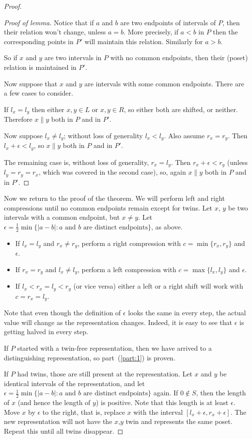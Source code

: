 \begin{proof}
\begin{proof}[Proof of lemma]
Notice that if $a$ and $b$ are two endpoints of intervals of $P$, then their relation won't change, unless $a=b$. More precisely, if $a<b$ in $P$ then the corresponding points in $P'$ will maintain this relation. Similarly for $a>b$.

So if $x$ and $y$ are two intervals in $P$ with no common endpoints, then their (poset) relation is maintained in $P'$.

Now suppose that $x$ and $y$ are intervals with some common endpoints. There are a few cases to consider.

If $l_x=l_y$ then either $x,y\in L$ or $x,y\in R$, so either both are shifted, or neither. Therefore $x\|y$ both in $P$ and in $P'$.

Now suppose $l_x\neq l_y$; without loss of generality $l_x<l_y$. Also assume $r_x=r_y$. Then $l_x+\epsilon<l_y$, so $x\|y$ both in $P$ and in $P'$.

The remaining case is, without loss of generality, $r_x=l_y$. Then $r_x+\epsilon<r_y$ (unless $l_y=r_y=r_x$, which was covered in the second case), so, again $x\|y$ both in $P$ and in $P'$.
\end{proof}

Now we return to the proof of the theorem. We will perform left and right compressions until no common endpoints remain except for twins. Let $x$, $y$ be two intervals with a common endpoint, but $x\neq y$. Let $\epsilon=\frac12\min\{|a-b|:\text{$a$ and $b$ are distinct endpoints}\}$, as above.

\begin{itemize}
\item
If $l_x=l_y$ and $r_x\neq r_y$, perform a right compression with $c=\min\{r_x,r_y\}$ and $\epsilon$.
\item
If $r_x=r_y$ and $l_x\neq l_y$, perform a left compression with $c=\max\{l_x,l_y\}$ and $\epsilon$.
\item If $l_x<r_x=l_y<r_y$ (or vice versa) either a left or a right shift will work with $c=r_x=l_y$.
\end{itemize}

Note that even though the definition of $\epsilon$ looks the same in every step, the actual value will change as the representation changes. Indeed, it is easy to see that $\epsilon$ is getting halved in every step.

If $P$ started with a twin-free representation, then we have arrived to a distinguishing representation, so part~(\ref{part:1}) is proven.

If $P$ had twins, those are still present at the representation. Let $x$ and $y$ be identical intervals of the representation, and let $\epsilon=\frac12\min\{|a-b|:\text{$a$ and $b$ are distinct endpoints}\}$ again. If $0\not\in S$, then the length of $x$ (and hence the length of $y$) is positive. Note that this length is at least $\epsilon$. Move $x$ by $\epsilon$ to the right, that is, replace $x$ with the interval $[l_x+\epsilon,r_x+\epsilon]$. The new representation will not have the $x$,$y$ twin and represents the same poset. Repeat this until all twins disappear.
\end{proof}


